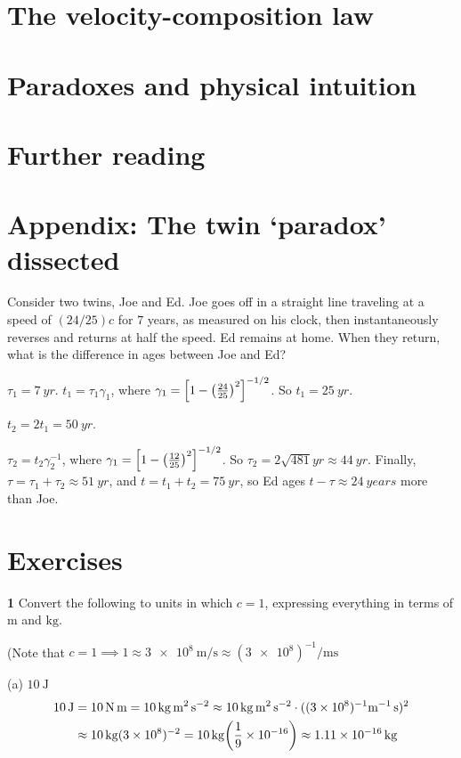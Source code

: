 \documentclass[gr-notes.tex]{subfiles}
\begin{document}
\section{The velocity-composition law}

\section{Paradoxes and physical intuition}

\section{Further reading}

\section{Appendix: The twin `paradox' dissected}

Consider two twins, Joe and Ed. Joe goes off in a straight line traveling at a speed of $(24/25) c$ for $7$ years, as measured on his clock, then instantaneously reverses and returns at half the speed. Ed remains at home. When they return, what is the difference in ages between Joe and Ed?

$\tau_1 = \SI{7}{yr}$. $t_1 = \tau_1 \gamma_1$, where $\gamma_1 = \qty[ 1 - \qty(\frac{24}{25})^2 ]^{-1/2}$. So $t_1 = \SI{25}{yr}$.

$t_2 = 2 t_1 = \SI{50}{yr}$.

$\tau_2 = t_2 \gamma_2^{-1}$, where $\gamma_1 = \qty[ 1 - \qty(\frac{12}{25})^2 ]^{-1/2}$. So $\tau_2 = 2 \sqrt{481} \si{yr} \approx \SI{44}{yr}$. Finally, $\tau = \tau_1 + \tau_2 \approx \SI{51}{yr}$, and $t = t_1 + t_2 = \SI{75}{yr}$, so Ed ages $t - \tau \approx \SI{24}{years}$ more than Joe.

\section{Exercises}
\label{sec:ch1-exercises}

\textbf{1}
Convert the following to units in which $c = 1$, expressing everything in terms of $\si{\meter}$ and $\si{\kilogram}$.

(Note that
$c = 1 \implies
 1 \approx \SI{3e8}{\meter\per\second}
   \approx (\num{3e8})^{-1}\si{\per\meter\second}$

(a) $\SI{10}{\joule}$
\begin{align*}
  \SI{10}{\joule} &=
  \SI{10}{\newton.\meter} =
  \SI{10}{\kilogram.\meter^2.\second^{-2}} \approx
  \SI{10}{\kilogram.\meter^2.\second^{-2}} \cdot
  ((\num{3e8})^{-1}\si{\meter^{-1}.\second})^2
  \\ &\approx
  \SI{10}{\kilogram} (\num{3e8})^{-2} =
  \SI{10}{\kilogram} \qty(\frac{1}{9} \times 10^{-16}) \approx
  \SI{1.11e-16}{\kilogram}
\end{align*}
\end{document}
